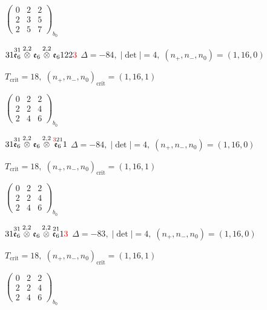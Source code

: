 \documentclass[10pt]{article}
\begin{document}
\hspace{2em}$\left(\begin{smallmatrix}0 & 2 & 2 \\ 2 & 3 & 5 \\ 2 & 5 & 7\end{smallmatrix}\right)_{\!b_0}$

\smallskip

$31\overset{31}{\mathfrak{e}_6}\overset{2,2}{\otimes}\mathfrak{e}_6\overset{2,2}{\otimes}\mathfrak{e}_6122\textcolor{red}{3}$ \quad $\Delta=-84,\; |\det|=4,\; (n_+,n_-,n_0)=(1,16,0)$

\hspace{1em}$T_{\text{crit}}=18,\; (n_+,n_-,n_0)_{\text{crit}}=(1,16,1)$

\hspace{2em}$\left(\begin{smallmatrix}0 & 2 & 2 \\ 2 & 2 & 4 \\ 2 & 4 & 6\end{smallmatrix}\right)_{\!b_0}$

\smallskip

$31\overset{31}{\mathfrak{e}_6}\overset{2,2}{\otimes}\mathfrak{e}_6\overset{2,2}{\otimes}\overset{\textcolor{red}{3}21}{\mathfrak{e}_6}1$ \quad $\Delta=-84,\; |\det|=4,\; (n_+,n_-,n_0)=(1,16,0)$

\hspace{1em}$T_{\text{crit}}=18,\; (n_+,n_-,n_0)_{\text{crit}}=(1,16,1)$

\hspace{2em}$\left(\begin{smallmatrix}0 & 2 & 2 \\ 2 & 2 & 4 \\ 2 & 4 & 6\end{smallmatrix}\right)_{\!b_0}$

$31\overset{31}{\mathfrak{e}_6}\overset{2,2}{\otimes}\mathfrak{e}_6\overset{2,2}{\otimes}\overset{21}{\mathfrak{e}_6}1\textcolor{red}{3}$ \quad $\Delta=-83,\; |\det|=4,\; (n_+,n_-,n_0)=(1,16,0)$

\hspace{1em}$T_{\text{crit}}=18,\; (n_+,n_-,n_0)_{\text{crit}}=(1,16,1)$

\hspace{2em}$\left(\begin{smallmatrix}0 & 2 & 2 \\ 2 & 2 & 4 \\ 2 & 4 & 6\end{smallmatrix}\right)_{\!b_0}$
\end{document}
